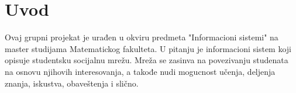 \section{Uvod}

Ovaj grupni projekat je urađen u okviru predmeta "Informacioni sistemi" na master studijama Matematickog fakulteta. U pitanju je informacioni sistem koji opisuje studentsku socijalnu mrežu. Mreža se zasinva na povezivanju studenata na osnovu njihovih interesovanja, a takođe nudi mogucnost učenja, deljenja znanja, iskustva, obaveštenja i slično.
